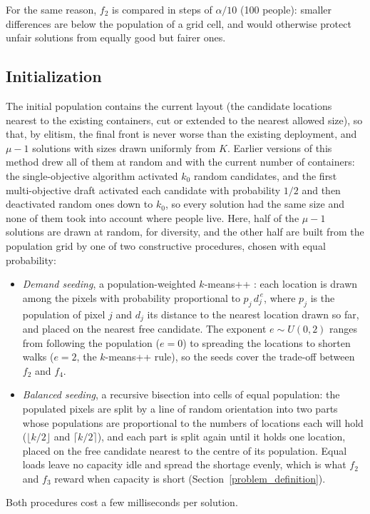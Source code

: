 For the same reason, $f_2$ is compared in steps of $\alpha/10$ (100 people): smaller differences are below the population of a grid cell, and would otherwise protect unfair solutions from equally good but fairer ones.

\subsection{Initialization}
The initial population contains the current layout (the candidate locations nearest to the existing containers, cut or extended to the nearest allowed size), so that, by elitism, the final front is never worse than the existing deployment, and $\mu - 1$ solutions with sizes drawn uniformly from $K$. Earlier versions of this method drew all of them at random and with the current number of containers: the single-objective algorithm \cite{moreno2024optimizing} activated $k_0$ random candidates, and the first multi-objective draft activated each candidate with probability $1/2$ and then deactivated random ones down to $k_0$, so every solution had the same size and none of them took into account where people live. Here, half of the $\mu - 1$ solutions are drawn at random, for diversity, and the other half are built from the population grid by one of two constructive procedures, chosen with equal probability:
\begin{itemize}
\item \emph{Demand seeding}, a population-weighted $k$-means++ \cite{arthur2007kmeans}: each location is drawn among the pixels with probability proportional to $p_j\, d_j^{\,e}$, where $p_j$ is the population of pixel $j$ and $d_j$ its distance to the nearest location drawn so far, and placed on the nearest free candidate. The exponent $e \sim U(0, 2)$ ranges from following the population ($e = 0$) to spreading the locations to shorten walks ($e = 2$, the $k$-means++ rule), so the seeds cover the trade-off between $f_2$ and $f_4$.
\item \emph{Balanced seeding}, a recursive bisection into cells of equal population: the populated pixels are split by a line of random orientation into two parts whose populations are proportional to the numbers of locations each will hold ($\lfloor k/2 \rfloor$ and $\lceil k/2 \rceil$), and each part is split again until it holds one location, placed on the free candidate nearest to the centre of its population. Equal loads leave no capacity idle and spread the shortage evenly, which is what $f_2$ and $f_3$ reward when capacity is short (Section~\ref{problem_definition}).
\end{itemize}
Both procedures cost a few milliseconds per solution.

